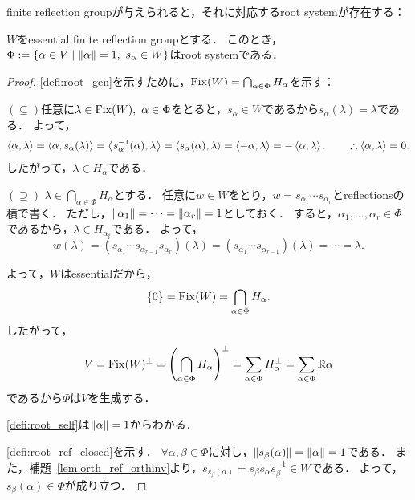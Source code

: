 finite reflection groupが与えられると，それに対応するroot systemが存在する：

\begin{prop} \label{prop:frg_to_root}
  $W$をessential finite reflection groupとする．
  このとき，$\Phi := \set{\alpha \in V}{\norm{\alpha} = 1,\ s_\alpha \in W}$はroot systemである．
\end{prop}
\begin{proof}
  \ref{defi:root_gen}を示すために，$\operatorname{Fix} (W) = \bigcap_{\alpha \in \Phi} H_\alpha$を示す：

  $(\subseteq)$任意に$\lambda \in \operatorname{Fix}(W),\ \alpha \in \Phi$をとると，$s_\alpha \in W$であるから$s_\alpha(\lambda) = \lambda$である．
  よって，
  \begin{equation}
    \left\langle \alpha, \lambda \right\rangle
    = \left\langle \alpha, s_\alpha(\lambda) \right\rangle
    = \left\langle s_\alpha^{-1}(\alpha), \lambda \right\rangle
    = \left\langle s_\alpha(\alpha), \lambda \right\rangle
    = \left\langle -\alpha, \lambda \right\rangle
    = -\left\langle \alpha, \lambda \right\rangle.
    \qquad \therefore \left\langle \alpha, \lambda \right\rangle = 0.
  \end{equation}
  したがって，$\lambda \in H_\alpha$である．

  $(\supseteq)$ $\lambda \in \bigcap_{\alpha \in \Phi} H_\alpha$とする．
  任意に$w \in W$をとり，$w = s_{\alpha_1} \cdots s_{\alpha_r}$とreflectionsの積で書く．
  ただし，$\left\| \alpha_1 \right\| = \cdots = \left\| \alpha_r \right\| = 1$としておく．
  すると，$\alpha_1, \ldots, \alpha_r \in \Phi$であるから，$\lambda \in H_{\alpha_i}$である．
  よって，
  \begin{equation}
    w(\lambda)
    = (s_{\alpha_1} \cdots s_{\alpha_{r-1}} s_{\alpha_r})(\lambda)
    = (s_{\alpha_1} \cdots s_{\alpha_{r-1}})(\lambda)
    = \cdots
    = \lambda.
  \end{equation}

  よって，$W$はessentialだから，
  \begin{equation}
    \{0\}
    = \operatorname{Fix}(W)
    = \bigcap_{\alpha \in \Phi} H_\alpha.
  \end{equation}
  したがって，
  \begin{equation}
    V
    = \operatorname{Fix}(W)^\perp
    = \left( \bigcap_{\alpha \in \Phi} H_\alpha \right)^\perp
    = \sum_{\alpha \in \Phi} H_\alpha^\perp
    = \sum_{\alpha \in \Phi} \mathbb{R}\alpha
  \end{equation}
  であるから$\Phi$は$V$を生成する．

  \ref{defi:root_self}は$\left\| \alpha \right\| = 1$からわかる．

  \ref{defi:root_ref_closed}を示す．
  $\forall \alpha, \beta \in \Phi$に対し，$\left\| s_\beta(\alpha) \right\| = \left\| \alpha \right\| = 1$である．
  また，補題~\ref{lem:orth_ref_orthinv}より，$s_{s_\beta(\alpha)} = s_\beta s_\alpha s_\beta^{-1} \in W$である．
  よって，$s_\beta(\alpha) \in \Phi$が成り立つ．
\end{proof}

